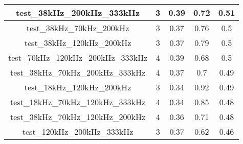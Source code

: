\begin{longtable}{|c|c|c|c|c|}
test\_38kHz\_200kHz\_333kHz                       & 3                                                                                              & 0.39                                    & 0.72                                 & 0.51                                    \\ \hline
test\_38kHz\_70kHz\_200kHz                        & 3                                                                                              & 0.37                                    & 0.76                                 & 0.5                                     \\ \hline
test\_38kHz\_120kHz\_200kHz                       & 3                                                                                              & 0.37                                    & 0.79                                 & 0.5                                     \\ \hline
test\_70kHz\_120kHz\_200kHz\_333kHz               & 4                                                                                              & 0.39                                    & 0.68                                 & 0.5                                     \\ \hline
test\_38kHz\_70kHz\_200kHz\_333kHz                & 4                                                                                              & 0.37                                    & 0.7                                  & 0.49                                    \\ \hline
test\_18kHz\_120kHz\_200kHz                       & 3                                                                                              & 0.34                                    & 0.92                                 & 0.49                                    \\ \hline
test\_18kHz\_70kHz\_120kHz\_333kHz                & 4                                                                                              & 0.34                                    & 0.85                                 & 0.48                                    \\ \hline
test\_38kHz\_70kHz\_120kHz\_200kHz                & 4                                                                                              & 0.36                                    & 0.71                                 & 0.48                                    \\ \hline
test\_120kHz\_200kHz\_333kHz                      & 3                                                                                              & 0.37                                    & 0.62                                 & 0.46                                    \\ \hline

\end{longtable}
